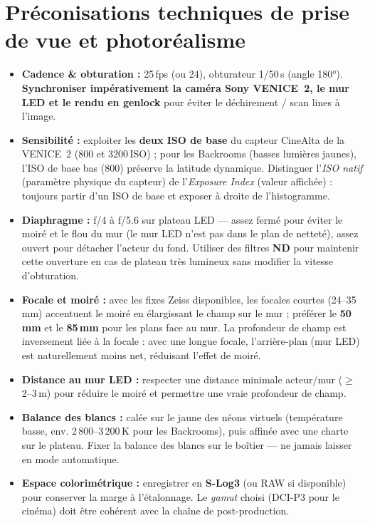 \documentclass[11pt,a4paper]{report}
\begin{document}
\section{Préconisations techniques de prise de vue et photoréalisme}
\begin{techbox}[title={Paramètres de prise de vue recommandés}]
\begin{itemize}
\item \textbf{Cadence \& obturation :} 25\,fps (ou 24), obturateur 1/50\,s (angle 180°). \textbf{Synchroniser impérativement la caméra Sony VENICE~2, le mur LED et le rendu en genlock} pour éviter le déchirement / scan lines à l'image.
\item \textbf{Sensibilité :} exploiter les \textbf{deux ISO de base} du capteur CineAlta de la VENICE~2 (800 et 3200\,ISO) ; pour les Backrooms (basses lumières jaunes), l'ISO de base bas (800) préserve la latitude dynamique. Distinguer l'\emph{ISO natif} (paramètre physique du capteur) de l'\emph{Exposure Index} (valeur affichée) : toujours partir d'un ISO de base et exposer à droite de l'histogramme.
\item \textbf{Diaphragme :} f/4 à f/5.6 sur plateau LED --- assez fermé pour éviter le moiré et le flou du mur (le mur LED n'est pas dans le plan de netteté), assez ouvert pour détacher l'acteur du fond. Utiliser des filtres \textbf{ND} pour maintenir cette ouverture en cas de plateau très lumineux sans modifier la vitesse d'obturation.
\item \textbf{Focale et moiré :} avec les fixes Zeiss disponibles, les focales courtes (24--35\,mm) accentuent le moiré en élargissant le champ sur le mur ; préférer le \textbf{50\,mm} et le \textbf{85\,mm} pour les plans face au mur. La profondeur de champ est inversement liée à la focale : avec une longue focale, l'arrière-plan (mur LED) est naturellement moins net, réduisant l'effet de moiré.
\item \textbf{Distance au mur LED :} respecter une distance minimale acteur/mur ($\geq$ 2--3\,m) pour réduire le moiré et permettre une vraie profondeur de champ.
\item \textbf{Balance des blancs :} calée sur le jaune des néons virtuels (température basse, env. 2\,800--3\,200\,K pour les Backrooms), puis affinée avec une charte sur le plateau. Fixer la balance des blancs sur le boîtier --- ne jamais laisser en mode automatique.
\item \textbf{Espace colorimétrique :} enregistrer en \textbf{S-Log3} (ou RAW si disponible) pour conserver la marge à l'étalonnage. Le \emph{gamut} choisi (DCI-P3 pour le cinéma) doit être cohérent avec la chaîne de post-production.
\end{itemize}
\end{techbox}
\end{document}
